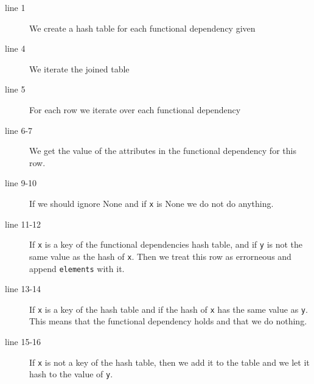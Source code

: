 \begin{description}
\item [line 1] We create a hash table for each functional dependency given
\item [line 4] We iterate the joined table
\item [line 5] For each row we iterate over each functional dependency
\item [line 6-7] We get the value of the attributes in the functional dependency for this row.
\item [line 9-10] If we should ignore None and if \texttt{x} is None we do not do anything.
\item [line 11-12] If \texttt{x} is a key of the functional dependencies hash table, and if \texttt{y} is not the same value as the hash of \texttt{x}.  Then we treat this row as errorneous and append \texttt{elements} with it.
\item [line 13-14] If \texttt{x} is a key of the hash table and if the hash of \texttt{x} has the same value as \texttt{y}. This means that the functional dependency holds and that we do nothing.
\item [line 15-16] If \texttt{x} is not a key of the hash table, then we add it to the table and we let it hash to the value of \texttt{y}.  
\end{description}
